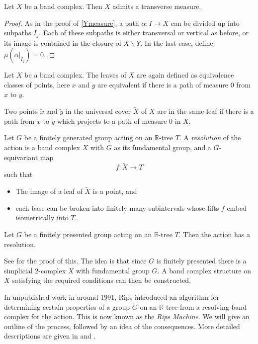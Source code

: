 \begin{lemma}
    Let $X$ be a band complex. Then $X$ admits a transverse measure. 
\end{lemma}
\begin{proof}
    As in the proof of \ref{Ymeasure}, a path $\alpha:I\rightarrow X$ can be divided up into subpaths $I_j$. Each of these subpaths is either transversal or vertical as before, or its image is contained in the closure of $X\backslash Y$. In the last case, define $\mu(\alpha\vert_{I_j})=0$.
\end{proof}

Let $X$ be a band complex. The leaves of $X$ are again defined as equivalence classes of points, here $x$ and $y$ are equivalent if there is a path of measure 0 from $x$ to $y$. 

Two points $\tilde{x}$ and $\tilde{y}$ in the universal cover $\tilde{X}$ of $X$ are in the same leaf if there is a path from $\tilde{x}$ to $\tilde{y}$ which projects to a path of measure 0 in $X$. 

\begin{definition}
    Let $G$ be a finitely generated group acting on an $\mathbb{R}$-tree $T$. A \emph{resolution} of the action is a band complex $X$ with $G$ as its fundamental group, and a $G$-equivariant map \[f:\tilde{X}\rightarrow T\] such that 
    \begin{itemize}
        \item The image of a leaf of $\tilde{X}$ is a point, and
        \item each base can be broken into finitely many subintervals whose lifts $f$ embed isometrically into $T$.
    \end{itemize}
\end{definition}


\begin{theorem}
    Let $G$ be a finitely presented group acting on an $\mathbb{R}$-tree $T$. Then the action has a resolution.
\end{theorem}
See \cite{Wilton} for the proof of this. The idea is that since $G$ is finitely presented there is a simplicial 2-complex $X$ with fundamental group $G$. A band complex structure on $X$ satisfying the required conditions can then be constructed.

In unpublished work in around 1991, Rips introduced an algorithm for determining certain properties of a group $G$ on an $\mathbb{R}$-tree from a resolving band complex for the action. This is now known as the \textit{Rips Machine}. We will give an outline of the process, followed by an idea of the consequences. More detailed descriptions are given in \cite{Wilton} and \cite{Bestvina_trees}.

